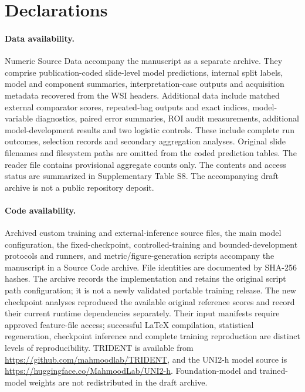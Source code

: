 \section*{Declarations}
\paragraph{Data availability.} Numeric Source Data accompany the manuscript as a separate archive. They comprise publication-coded slide-level model predictions, internal split labels, model and component summaries, interpretation-case outputs and acquisition metadata recovered from the WSI headers. Additional data include matched external comparator scores, repeated-bag outputs and exact indices, model-variable diagnostics, paired error summaries, ROI audit measurements, additional model-development results and two logistic controls. These include complete run outcomes, selection records and secondary aggregation analyses. Original slide filenames and filesystem paths are omitted from the coded prediction tables. The reader file contains provisional aggregate counts only. The contents and access status are summarized in Supplementary Table S8.  The accompanying draft archive is not a public repository deposit.

\paragraph{Code availability.} Archived custom training and external-inference source files, the main model configuration, the fixed-checkpoint, controlled-training and bounded-development protocols and runners, and metric/figure-generation scripts accompany the manuscript in a Source Code archive. File identities are documented by SHA-256 hashes. The archive records the implementation and retains the original script path configuration; it is not a newly validated portable training release. The new checkpoint analyses reproduced the available original reference scores and record their current runtime dependencies separately. Their input manifests require approved feature-file access; successful LaTeX compilation, statistical regeneration, checkpoint inference and complete training reproduction are distinct levels of reproducibility. TRIDENT is available from \url{https://github.com/mahmoodlab/TRIDENT}, and the UNI2-h model source is \url{https://huggingface.co/MahmoodLab/UNI2-h}. Foundation-model and trained-model weights are not redistributed in the draft archive. 

